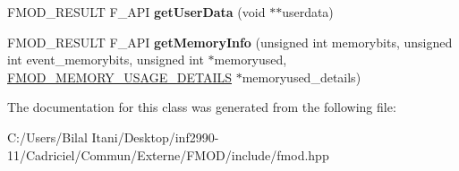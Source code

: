 \begin{DoxyCompactItemize}
\item 
F\+M\+O\+D\+\_\+\+R\+E\+S\+U\+LT F\+\_\+\+A\+PI {\bfseries get\+User\+Data} (void $\ast$$\ast$userdata)\hypertarget{class_f_m_o_d_1_1_system_a04c439bfbbfa385ce819b29b26584fc5}{}\label{class_f_m_o_d_1_1_system_a04c439bfbbfa385ce819b29b26584fc5}

\item 
F\+M\+O\+D\+\_\+\+R\+E\+S\+U\+LT F\+\_\+\+A\+PI {\bfseries get\+Memory\+Info} (unsigned int memorybits, unsigned int event\+\_\+memorybits, unsigned int $\ast$memoryused, \hyperlink{struct_f_m_o_d___m_e_m_o_r_y___u_s_a_g_e___d_e_t_a_i_l_s}{F\+M\+O\+D\+\_\+\+M\+E\+M\+O\+R\+Y\+\_\+\+U\+S\+A\+G\+E\+\_\+\+D\+E\+T\+A\+I\+LS} $\ast$memoryused\+\_\+details)\hypertarget{class_f_m_o_d_1_1_system_a248a17e258aa12ccc32c85c7a5a4f64c}{}\label{class_f_m_o_d_1_1_system_a248a17e258aa12ccc32c85c7a5a4f64c}

\end{DoxyCompactItemize}


The documentation for this class was generated from the following file\+:\begin{DoxyCompactItemize}
\item 
C\+:/\+Users/\+Bilal Itani/\+Desktop/inf2990-\/11/\+Cadriciel/\+Commun/\+Externe/\+F\+M\+O\+D/include/fmod.\+hpp\end{DoxyCompactItemize}
